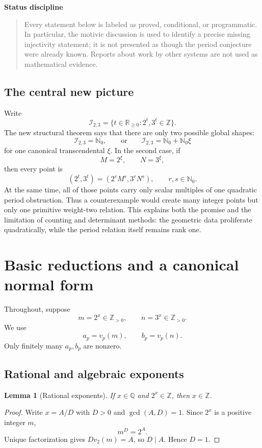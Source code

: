 \documentclass[11pt,oneside]{article}
\newtheorem{lemma}[theorem]{Lemma}
\theoremstyle{definition}
\newcommand{\N}{\mathbb N}
\newcommand{\Z}{\mathbb Z}
\newcommand{\Q}{\mathbb Q}
\newcommand{\R}{\mathbb R}
\newcommand{\Ispace}{\mathscr I_{2,3}}
\newenvironment{statusbox}[1]{%
  \begin{center}\begin{minipage}{0.94\textwidth}
  \colorbox{softgray}{\parbox{0.965\textwidth}{\textbf{#1}\par\smallskip}}
  \vspace{-0.8em}\begin{quote}\small
}{\end{quote}\end{minipage}\end{center}}
\begin{document}
\begin{statusbox}{Status discipline}
Every statement below is labeled as proved, conditional, or programmatic.  In particular, the motivic discussion is used to identify a precise missing injectivity statement; it is not presented as though the period conjecture were already known.  Reports about work by other systems are not used as mathematical evidence.
\end{statusbox}

\subsection{The central new picture}

Write
\[
  \Ispace=\{t\in\R_{\ge0}:2^t,3^t\in\Z\}.
\]
The new structural theorem says that there are only two possible global shapes:
\[
  \Ispace=\N_0,
  \qquad\text{or}\qquad
  \Ispace=\N_0+\N_0\xi
\]
for one canonical transcendental $\xi$.  In the second case, if
\[
  M=2^\xi,\qquad N=3^\xi,
\]
then every point is
\[
  (2^t,3^t)=(2^rM^s,3^rN^s),\qquad r,s\in\N_0.
\]
At the same time, all of those points carry only scalar multiples of one quadratic period obstruction.  Thus a counterexample would create many integer points but only one primitive weight-two relation.  This explains both the promise and the limitation of counting and determinant methods: the geometric data proliferate quadratically, while the period relation itself remains rank one.

\section{Basic reductions and a canonical normal form}

Throughout, suppose
\[
  m=2^x\in\Z_{>0},\qquad n=3^x\in\Z_{>0}.
\]
We use
\[
  a_p=v_p(m),\qquad b_p=v_p(n).
\]
Only finitely many $a_p,b_p$ are nonzero.

\subsection{Rational and algebraic exponents}

\begin{lemma}[Rational exponents]
If $x\in\Q$ and $2^x\in\Z$, then $x\in\Z$.
\end{lemma}

\begin{proof}
Write $x=A/D$ with $D>0$ and $\gcd(A,D)=1$.  Since $2^x$ is a positive integer $m$,
\[
  m^D=2^A.
\]
Unique factorization gives $D v_2(m)=A$, so $D\mid A$.  Hence $D=1$.
\end{proof}
\end{document}
